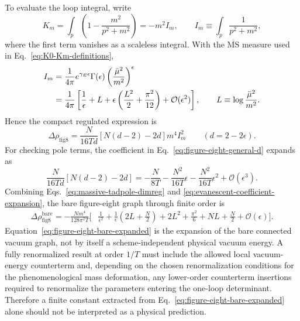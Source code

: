 To evaluate the loop integral, write
\begin{equation}
  K_m
  = \int_p\left(1-\frac{m^2}{p^2+m^2}\right)
  = -m^2 I_m,
  \qquad
  I_m \equiv \int_p\frac{1}{p^2+m^2},
  \label{eq:Km-Im-relation}
\end{equation}
where the first term vanishes as a scaleless integral.  With the
$\overline{\mathrm{MS}}$ measure used in Eq.~\eqref{eq:K0-Km-definitions},
\begin{align}
  I_m
  &= \frac{1}{4\pi}
     e^{\gamma_E\epsilon}\Gamma(\epsilon)
     \left(\frac{\bar\mu^2}{m^2}\right)^\epsilon
  \notag\\
  &= \frac{1}{4\pi}
     \left[
       \frac{1}{\epsilon}
       +L
       +\epsilon\left(\frac{L^2}{2}+\frac{\pi^2}{12}\right)
       +\mathcal O(\epsilon^2)
     \right],
  \qquad
  L\equiv\log\frac{\bar\mu^2}{m^2} .
  \label{eq:massive-tadpole-dimreg}
\end{align}
Hence the compact regulated expression is
\begin{equation}
  \boxed{
  \Delta\rho_{\mathrm{fig8}}
  = \frac{N}{16Td}
    \left[N(d-2)-2d\right]
    m^4 I_m^2
  }
  \qquad (d=2-2\epsilon).
  \label{eq:figure-eight-compact-result}
\end{equation}
For checking pole terms, the coefficient in Eq.~\eqref{eq:figure-eight-general-d}
expands as
\begin{equation}
  \frac{N}{16Td}\left[N(d-2)-2d\right]
  = -\frac{N}{8T}
    -\frac{N^2}{16T}\epsilon
    -\frac{N^2}{16T}\epsilon^2
    +\mathcal O(\epsilon^3).
  \label{eq:evanescent-coefficient-expansion}
\end{equation}
Combining Eqs.~\eqref{eq:massive-tadpole-dimreg} and
\eqref{eq:evanescent-coefficient-expansion}, the bare figure-eight graph through
finite order is
\begin{align}
  \Delta\rho_{\mathrm{fig8}}^{\mathrm{bare}}
  = -\frac{N m^4}{128\pi^2T}
  \Bigg[
    &\frac{1}{\epsilon^2}
    +\frac{1}{\epsilon}\left(2L+\frac{N}{2}\right)
    +2L^2+\frac{\pi^2}{6}
    +NL+\frac{N}{2}
    +\mathcal O(\epsilon)
  \Bigg].
  \label{eq:figure-eight-bare-expanded}
\end{align}
Equation~\eqref{eq:figure-eight-bare-expanded} is the expansion of the bare
connected vacuum graph, not by itself a scheme-independent physical vacuum
energy.  A fully renormalized result at order $1/T$ must include the allowed
local vacuum-energy counterterm and, depending on the chosen renormalization
conditions for the phenomenological mass deformation, any lower-order
counterterm insertions required to renormalize the parameters entering the
one-loop determinant.  Therefore a finite constant extracted from
Eq.~\eqref{eq:figure-eight-bare-expanded} alone should not be interpreted as a
physical prediction.

